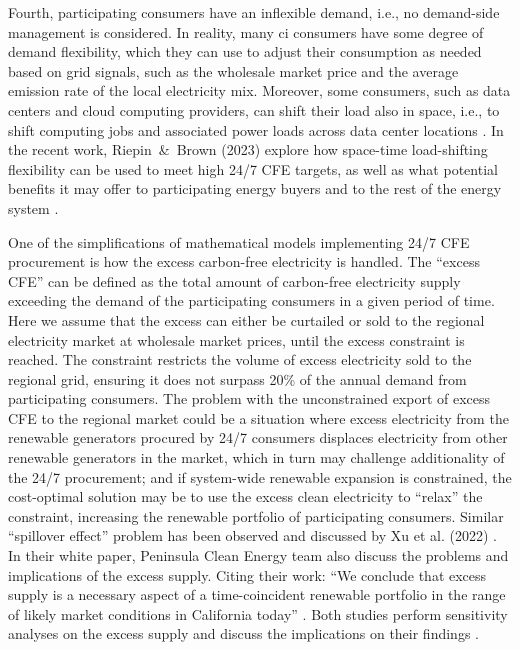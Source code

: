 \documentclass[11pt, 5p, nopreprintline]{elsarticle}
\begin{document}
Fourth, participating consumers have an inflexible demand, i.e., no demand-side management is considered.
In reality, many \gls{ci} consumers have some degree of demand flexibility, which they can use to adjust their consumption as needed based on grid signals, such as the wholesale market price and the average emission rate of the local electricity mix.
Moreover, some consumers, such as data centers and cloud computing providers, can shift their load also in space, i.e., to shift computing
jobs and associated power loads across data center locations \cite{rosskoningsteinWeNowMore2021}.
In the recent work, Riepin~\&~Brown (2023) explore how space-time load-shifting flexibility can be used to meet high 24/7 CFE targets, as well as what potential benefits it may offer to participating energy buyers and to the rest of the energy system \cite{riepin-zenodo-spacetime247CFE}.

One of the simplifications of mathematical models implementing 24/7 CFE procurement is how the excess carbon-free electricity is handled.
The \enquote{excess CFE} can be defined as the total amount of carbon-free electricity supply exceeding the demand of the participating consumers in a given period of time.
Here we assume that the excess can either be curtailed or sold to the regional electricity market at wholesale market prices, until the excess constraint is reached.
The constraint restricts the volume of excess electricity sold to the regional grid, ensuring it does not surpass 20\% of the annual demand from participating consumers.
The problem with the unconstrained export of excess CFE to the regional market could be a situation where excess electricity from the renewable generators procured by 24/7 consumers displaces electricity from other renewable generators in the market, which in turn may challenge additionality of the 24/7 procurement; and if system-wide renewable expansion is constrained, the cost-optimal solution may be to use the excess clean electricity to \enquote{relax} the constraint, increasing the renewable portfolio of participating consumers.
Similar \enquote{spillover effect} problem has been observed and discussed by Xu et al. (2022) \cite{xu-247CFE-SSRN}.
In their white paper, Peninsula Clean Energy team also discuss the problems and implications of the excess supply. Citing their work: \enquote{We conclude that excess supply is a necessary aspect of a time-coincident renewable portfolio in the range of likely market conditions in California today} \cite{peninsula-report247}.
Both studies perform sensitivity analyses on the excess supply and discuss the implications on their findings \cite{xu-247CFE-SSRN, peninsula-report247}.
\end{document}
